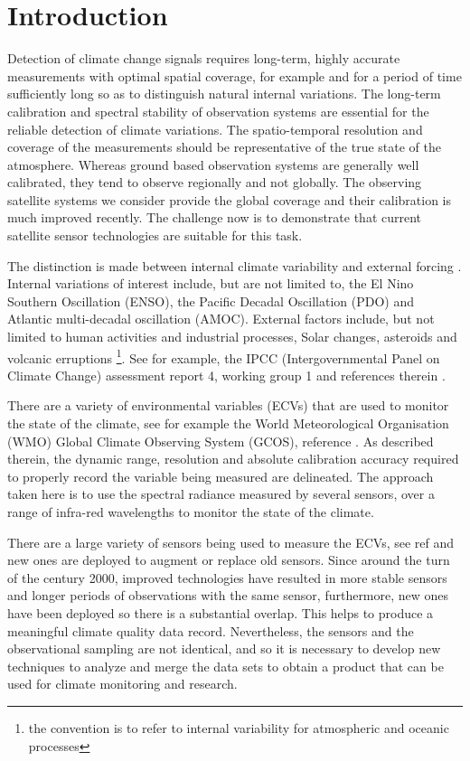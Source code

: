 \documentclass[11pt]{article}
\begin{document}
\section{Introduction}
\label{sec:orgheadline2}

Detection of climate change signals requires long-term, highly accurate measurements with optimal spatial coverage, for example \cite{wielicki2013} and for a period of time sufficiently long so as to distinguish natural internal variations. The long-term calibration and spectral stability of observation systems are essential for the reliable detection of climate variations. The spatio-temporal resolution and coverage of the measurements should be representative of the true state of the atmosphere. Whereas ground based observation systems are generally well calibrated, they tend to observe regionally and not globally. The observing satellite systems we consider provide the global coverage and their calibration is much improved recently. The challenge now is to demonstrate that current satellite sensor technologies are suitable for this task.

The distinction is made between internal climate variability and external forcing \cite{solomon2010}. Internal variations of interest include, but are not limited to, the El Nino Southern Oscillation (ENSO), the Pacific Decadal Oscillation (PDO) and Atlantic multi-decadal oscillation (AMOC). External factors include, but not limited to human activities and industrial processes, Solar changes, asteroids and volcanic erruptions \footnote{the convention is to refer to internal variability for atmospheric and oceanic processes }. See for example, the IPCC (Intergovernmental Panel on Climate Change) assessment report 4, working group 1 and references therein \cite{ipcc2007_wg1}. 

There are a variety of environmental variables (ECVs) that are used to monitor the state of the climate, see for example the World Meteorological Organisation (WMO) Global Climate Observing System (GCOS), reference \cite{gcos}. As described therein, the dynamic range, resolution and absolute calibration accuracy required to properly record the variable being measured are delineated. The approach taken here is to use the spectral radiance measured by several sensors, over a range of infra-red wavelengths to monitor the state of the climate.

There are a large variety of sensors being used to measure the ECVs, see ref \cite{Hollmann2013} and new ones are deployed to augment or replace old sensors.  Since around the turn of the century 2000, improved technologies have resulted in more stable sensors and longer periods of observations with the same sensor, furthermore, new ones have been deployed so there is a substantial overlap. This helps to produce a meaningful climate quality data record. Nevertheless, the sensors and the observational sampling are not identical, and so it is necessary to develop new techniques to analyze and merge the data sets to obtain a product that can be used for climate monitoring and research.
\end{document}
